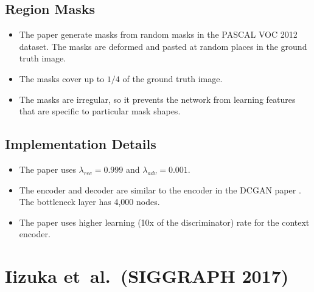 \documentclass[10pt]{article}
\newcommand{\etal}{{et~al.}}
\begin{document}
  \subsection{Region Masks}

  \begin{itemize}
  	\item The paper generate masks from random masks in the PASCAL VOC 2012 dataset. The masks are deformed and pasted at random places in the ground truth image.

  	\item The masks cover up to $1/4$ of the ground truth image.

  	\item The masks are irregular, so it prevents the network from learning features that are specific to particular mask shapes.
  \end{itemize}

  \subsection{Implementation Details}

  \begin{itemize} 
  	\item The paper uses $\lambda_{rec} = 0.999$ and $\lambda_{adv} = 0.001$.

  	\item The encoder and decoder are similar to the encoder in the DCGAN paper \cite{Radford:2015}. The bottleneck layer has 4,000 nodes.

  	\item The paper uses higher learning (10x of the discriminator) rate for the context encoder.
  \end{itemize}

  \section{Iizuka \etal~(SIGGRAPH 2017)}
\end{document}
